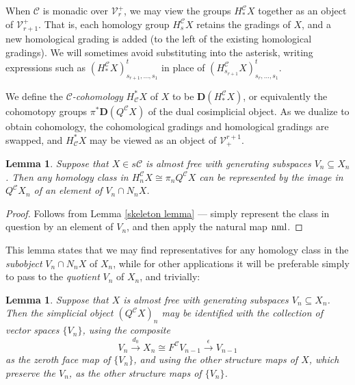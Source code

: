 \documentclass[11pt]{amsart} \renewcommand{\baselinestretch}{1.4}
\theoremstyle{plain}
\newtheorem{lem}[thm]{Lemma}
\theoremstyle{definition}
\renewcommand{\to}{\longrightarrow}
\newcommand{\calV}{\mathcal{V}}
\newcommand{\calc}{\mathcal{C}}
\newcommand{\vect}[2]{\calV^{#1}_{#2}}
\newcommand{\epi}{{\,\makebox[0cm][l]{\ensuremath\to}\to{}}}
\newcommand{\dual}{\mathbf{D}}
\begin{document}
\begin{Conventions and notation}
When $\calc$ is monadic over $\vect{+}{r}$, we may view the groups $H_*^{\calc}X$ together as an object of $\vect{+}{r+1}$. That is, each homology group $H_s^\calc X$ retains the gradings of $X$, and a new homological grading is added (to the left of the existing homological gradings). We will sometimes avoid substituting into the asterisk, writing expressions such as $(H_*^\calc X)_{s_{r+1},\ldots,s_1}^t$ in place of $(H_{s_{r+1}}^\calc X)_{s_r,\ldots,s_1}^t$.

We define the \emph{$\calc$-cohomology} $H^*_\calc X$ of $X$ to be $\dual(H_*^\calc X)$, or equivalently the cohomotopy groups $\pi^*\dual(Q^\calc X)$ of the dual cosimplicial object.  As we dualize to obtain cohomology, the cohomological gradings and homological gradings are swapped, and $H^*_{\calc}X$ may be viewed as an object of $\vect{r+1}{+}$. 


\begin{lem}
\label{lemma on homology class repd by normalized generator}
Suppose that $X\in s\calc$ is almost free with generating subspaces $V_n\subseteq X_n$. Then any homology class in $H_n^{\calc}X\cong \pi_nQ^{\calc}X$ can be represented by the image in $Q^{\calc}X_n$ of an element of $V_n\cap N_nX$.
\end{lem}
\begin{proof}
Follows from Lemma \ref{skeleton lemma} --- simply represent the class in question by an element of $V_n$, and then apply the natural map $\textup{nml}$. %
\end{proof}
\noindent This lemma states that we may find representatives for any homology class in the \emph{subobject} $V_n\cap N_nX$ of $X_n$, while for other applications it will be preferable simply to pass to the \emph{quotient} $V_n$ of $X_n$, and trivially: %
\begin{lem}
\label{identify almost free indecs with gens}
Suppose that $X$ is almost free with generating subspaces $V_n\subseteq X_n$. Then the simplicial object $(Q^{\calc}X)_{n}$ may be identified with the collection of vector spaces $\{V_n\}$, using  the composite
\[V_{n}\overset{d_0}{\to}X_n\cong F^{\calc}V_{n-1}\overset{\epsilon}{\to}V_{n-1}\]
as the zeroth face map of $\{V_n\}$, and using the other structure maps of $X$, which preserve the $V_{n}$, as the other structure maps of $\{V_n\}$.
\end{lem}




\end{Conventions and notation}
\end{document}
